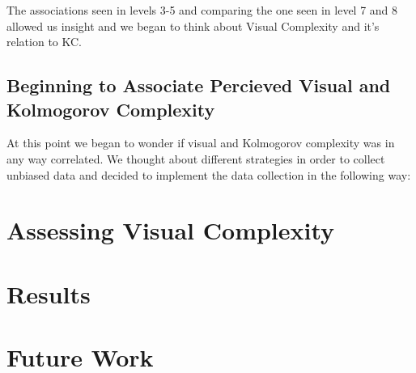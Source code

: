 \documentclass[11pt]{article}
\begin{document}
{The associations seen in levels 3-5 and comparing the one seen in level 7 and 8 allowed us
insight and we began to think about Visual Complexity and it's relation to KC.




\subsection{Beginning to Associate Percieved Visual and Kolmogorov Complexity}

At this point we began to wonder if visual and Kolmogorov complexity
was in any way correlated. We thought about different strategies in order to collect 
unbiased data and decided to implement the data collection in the following way:


}

\section{Assessing Visual Complexity}

\section{Results}

\section{Future Work}
\end{document}
